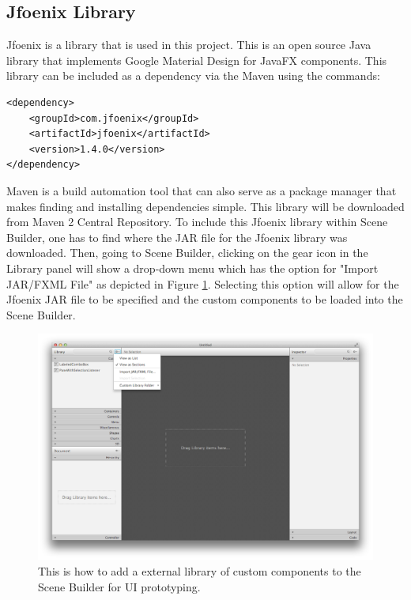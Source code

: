 \subsection{Jfoenix Library}
Jfoenix is a library that is used in this project. This is an open source Java library that implements Google Material Design for JavaFX components. This library can be included as a dependency via the Maven using the commands:  
\begin{lstlisting}
<dependency>
    <groupId>com.jfoenix</groupId>
    <artifactId>jfoenix</artifactId>
    <version>1.4.0</version>
</dependency>
\end{lstlisting}

Maven is a build automation tool that can also serve as a package manager that makes finding and installing dependencies simple. This library will be downloaded from Maven 2 Central Repository. To include this Jfoenix library within Scene Builder, one has to find where the JAR file for the Jfoenix library was downloaded. Then, going to Scene Builder, clicking on the gear icon in the Library panel will show a drop-down menu which has the option for "Import JAR/FXML File" as depicted in Figure \ref{fig:addLibrarySceneBuilder}. Selecting this option will allow for the Jfoenix JAR file to be specified and the custom components to be loaded into the Scene Builder. 
\begin{figure}[th]
\centering
\includegraphics[scale=0.35]{Figures/addLibrarySceneBuilder.png}
\caption[External Libraries]{This is how to add a external library of custom components to the Scene Builder for UI prototyping.}
\label{fig:addLibrarySceneBuilder}
\end{figure}
